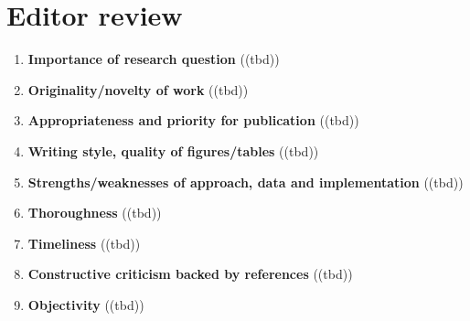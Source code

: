 \section{Editor review}\label{sec:editorreview}
\begin{enumerate}[resume]
    \item \textbf{Importance of research question} 	\textcolor{HighlightColor}{((tbd))}
    \item \textbf{Originality/novelty of work} 	\textcolor{HighlightColor}{((tbd))}
    \item \textbf{Appropriateness and priority for publication} 	\textcolor{HighlightColor}{((tbd))}
    \item \textbf{Writing style, quality of figures/tables} 	\textcolor{HighlightColor}{((tbd))}
    \item \textbf{Strengths/weaknesses of approach, data and implementation} 	\textcolor{HighlightColor}{((tbd))}
    \item \textbf{Thoroughness} 	\textcolor{HighlightColor}{((tbd))}
    \item \textbf{Timeliness} 	\textcolor{HighlightColor}{((tbd))}
    \item \textbf{Constructive criticism backed by references} 	\textcolor{HighlightColor}{((tbd))}
    \item \textbf{Objectivity} 	\textcolor{HighlightColor}{((tbd))}
\end{enumerate}
